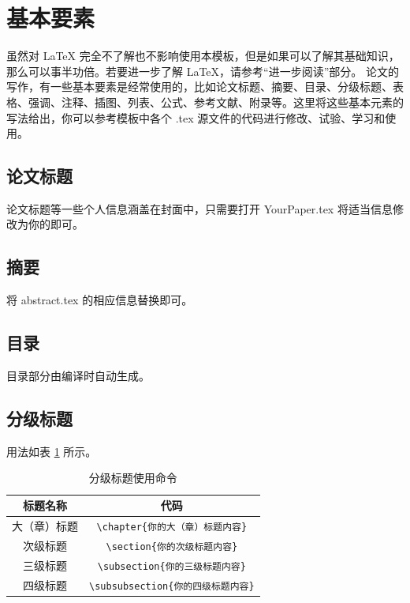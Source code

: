 \section{基本要素}
虽然对 LaTeX 完全不了解也不影响使用本模板，但是如果可以了解其基础知识，那么可以事半功倍。若要进一步了解 LaTeX，请参考“进一步阅读”部分。
论文的写作，有一些基本要素是经常使用的，比如论文标题、摘要、目录、分级标题、表格、强调、注释、插图、列表、公式、参考文献、附录等。这里将这些基本元素的写法给出，你可以参考模板中各个 .tex 源文件的代码进行修改、试验、学习和使用。

\subsection{论文标题}
论文标题等一些个人信息涵盖在封面中，只需要打开 YourPaper.tex 将适当信息修改为你的即可。

\subsection{摘要}
将 abstract.tex 的相应信息替换即可。

\subsection{目录}
目录部分由编译时自动生成。

\subsection{分级标题}
用法如表 \ref{tab:fjbt} 所示。
{
\begin{longtable}{cc}
	\caption{分级标题使用命令}\label{tab:fjbt}\\
	\toprule
	标题名称&	代码\\
	\midrule
	大（章）标题&	\verb|\chapter{你的大（章）标题内容}|\\
	次级标题&	\verb|\section{你的次级标题内容}|\\
	三级标题&	\verb|\subsection{你的三级标题内容}|\\
	四级标题&	\verb|\subsubsection{你的四级标题内容}|\\
	\bottomrule
\end{longtable}
}

